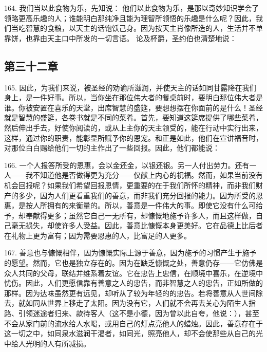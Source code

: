 164. 我们当以此食物为乐，先知说： 他们以此食物为乐，是那以奇妙知识学会了领略更高乐趣的人；谁能明白那纯净且能为理智所领悟的乐趣是什么呢？因此，我们当吃智慧的食粮，以天主的话饱饫己身。因为按天主肖像所造的人，生活并不单靠饼，也靠由天主口中所发的一切言语。 论及杯爵，圣约伯也清楚地说：\par


\subsection{第三十二章}

\par

165. 因此，为我们来说，被圣经的劝谕所滋润，并使天主的话如同甘露降在我们身上，是一件好事。所以，当你坐在那位伟大者的餐桌前时，要明白那位伟大者是谁。你被安置在喜乐的天堂，出席智慧的盛筵，要想想摆在你面前的是什么！圣经就是智慧的盛筵，各卷书就是不同的菜肴。首先，要知道这筵席提供了哪些菜肴，然后伸出手去，好使你阅读的，或从上主你的天主领受的，能在行动中实行出来，这样，通过你的职责，能彰显所赋予你的恩宠。和正是如此，他们在宣讲福音时，对那位白白赐给他们一切的主作出了一些回报。因此，他们都能说：\par

166. 一个人报答所受的恩惠，会以金还金，以银还银。另一人付出劳力。还有一人——我不知道他是否做得更为充分——仅献上内心的祝福。然而，如果当前没有机会回报呢？如果我们希望回报恩情，更重要的在于我们所怀的精神，而非我们财产的多少，因为人们更看重我们的善意，而非我们充分回报的能力。因为所受的恩惠，是按人所拥有的来衡量的。所以，善意是一件伟大的事。即使它没有什么可给予，却奉献得更多；虽然它自己一无所有，却慷慨地施予许多人，而且这样做，自己毫无损失，却使许多人受益。因此，善意比慷慨本身更美好。它在品德上比后者在礼物上更为富有；因为需要恩惠的人，比富足的人更多。\par

167. 善意也与慷慨相伴，因为慷慨实际上源于善意，因为施予的习惯产生于施予的愿望。然而，它也是独立存在的。因为在缺乏慷慨之处，善意仍存——它仿佛是众人共同的父母，联结并维系着友谊。它在忠告上忠信，在顺境中喜乐，在逆境中忧伤。因此，人们更愿信靠有善意之人的忠告，而非智慧之人的忠告，正如所做的那样。因为达味虽然更有远见，却听从了较为年轻的的忠告。若将善意从人世间除去，就如同从世界上移走了太阳。因为没有它，人们就不会再去关心为陌生人指路、引领迷途者归来、款待客人（这不是小德，因为曾以此自夸，他说：），甚至不会从家门前的流水给人水喝，或用自己的灯点亮他人的蜡烛。因此，善意存在于这一切之中，如同泉水滋润干渴者，如同光，照亮他人，却不会使那些从自己的光中给人光明的人有所减损。\par

